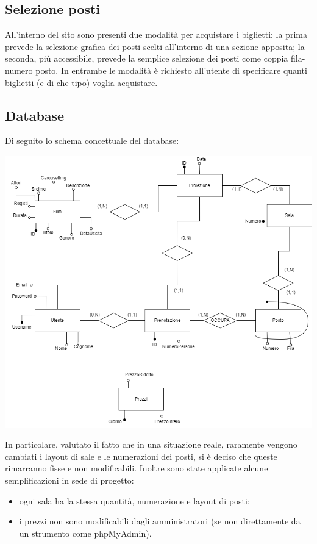 \documentclass[a4paper, 12pt]{article}
\begin{document}
\subsection{Selezione posti}
All'interno del sito sono presenti due modalità per acquistare i biglietti: la prima prevede la selezione grafica dei posti scelti all'interno di una sezione apposita; la seconda, più accessibile, prevede la semplice selezione dei posti come coppia fila-numero posto. In entrambe le modalità è richiesto all'utente di specificare quanti biglietti (e di che tipo) voglia acquistare.

\subsection{Database}
Di seguito lo schema concettuale del database:

\begin{center}
    \includegraphics[scale=0.5]{database}
\end{center}

In particolare, valutato il fatto che in una situazione reale, raramente vengono cambiati i layout di sale e le numerazioni dei posti, si è deciso che queste rimarranno fisse e non modificabili. Inoltre sono state applicate alcune semplificazioni in sede di progetto: 
\begin{itemize}
\item ogni sala ha la stessa quantità, numerazione e layout di posti;
\item i prezzi non sono modificabili dagli amministratori (se non direttamente da un strumento come phpMyAdmin).
\end{itemize}
\end{document}
